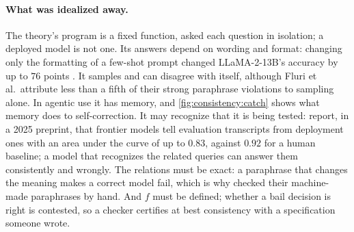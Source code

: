 \begin{refsection}
\paragraph{What was idealized away.} The theory's program is a fixed function, asked each question in isolation; a deployed model is not one. Its answers depend on wording and format: changing only the formatting of a few-shot prompt changed LLaMA-2-13B's accuracy by up to $76$ points \parencite{SclarEtAl2024}. It samples and can disagree with itself, although Fluri et al.\ attribute less than a fifth of their strong paraphrase violations to sampling alone. In agentic use it has memory, and \cref{fig:consistency:catch} shows what memory does to self-correction. It may recognize that it is being tested: \textcite{NeedhamEtAl2025} report, in a 2025 preprint, that frontier models tell evaluation transcripts from deployment ones with an area under the curve of up to $0.83$, against $0.92$ for a human baseline; a model that recognizes the related queries can answer them consistently and wrongly. The relations must be exact: a paraphrase that changes the meaning makes a correct model fail, which is why \textcite{FluriEtAl2024} checked their machine-made paraphrases by hand. And $f$ must be defined; whether a bail decision is right is contested, so a checker certifies at best consistency with a specification someone wrote.


\end{refsection}
